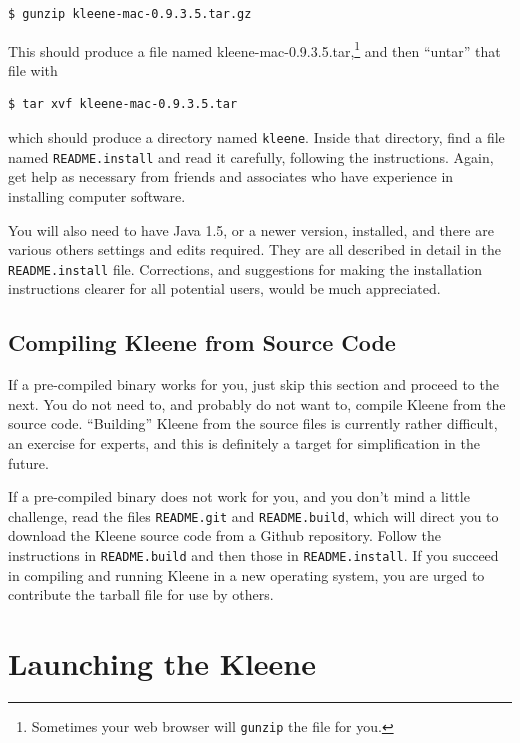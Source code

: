 \begin{Verbatim}
$ gunzip kleene-mac-0.9.3.5.tar.gz
\end{Verbatim}

\noindent
This should produce a file named kleene-mac-0.9.3.5.tar,\footnote{Sometimes 
your web browser will \texttt{gunzip} the file for you.} and then ``untar'' that file with

\begin{Verbatim}
$ tar xvf kleene-mac-0.9.3.5.tar
\end{Verbatim}

\noindent
which should produce a directory named \texttt{kleene}.  Inside that directory, 
find a file named \texttt{README.install} and read it carefully, following the 
instructions.  Again, get help as necessary from friends and associates who have 
experience in installing computer
software.

You will also need to have Java 1.5, or a newer version, installed, and
there are various others settings and edits required.  They are all
described in detail in the \texttt{README.install} file.
Corrections, and suggestions for making the installation instructions clearer for all
potential users, would be much appreciated.

\subsection{Compiling Kleene from Source Code}

If a pre-compiled binary works for you, just skip this section and proceed to the next.
You do not need to, and probably do not want to, compile Kleene from the
source code.  ``Building'' Kleene from the source files is currently
rather difficult, an exercise for experts, and this is definitely a target
for simplification in the future.

If a pre-compiled binary does not work for you, and you don't mind a little
challenge, read the files \texttt{README.git} and \texttt{README.build},
which will direct you to download the Kleene source code from a Github
repository.  Follow the instructions in \texttt{README.build} and then
those in \texttt{README.install}.  If you succeed in compiling and running
Kleene in a new operating system, you are urged to contribute the
tarball file for use by others.

\section{Launching the Kleene }

